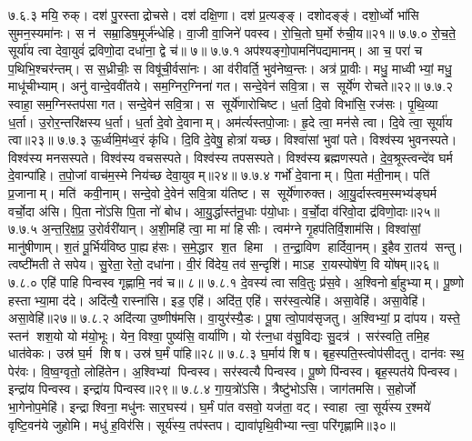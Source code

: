 ७.६.३
मयि॒ रुक्। दश॑ पु॒रस्ताद्रोचसे। दश॑ दक्षि॒णा। दश॑ प्र॒त्यङ्ङ्। दशोदङ्ङ्॑। दशो॒र्ध्वो भा॑सि सुमन॒स्यमा॑नः। स न॑ सम्रा॒डिष॒मूर्ज॑न्धेहि। वा॒जी वा॒जिने॑ पवस्व। रो॒चि॒तो घ॒र्मो रु॑ची॒य॥२१॥
७.७.०
रो॒च॒ते॒ सूर्या॑य त्वा देवा॒युवं॑ द्रविणो॒दा दधा॑ना॒ द्वे च॑॥ ७॥
\anuvakamend
७.७.१
अप॑श्यङ्गो॒पामनि॑पद्यमानम्। आ च॒ परा॑ च प॒थिभि॒श्चर॑न्तम्। स स॒ध्रीचीः॒ स विषू॑ची॒र्वसा॑नः। आ व॑रीवर्ति॒ भुव॑नेष्व॒न्तः। अत्र॑ प्रा॒वीः। मधु॒ माध्वीभ्यां॒ मधु॒ माधू॑चीभ्याम्। अनु॑ वान्दे॒ववी॑तये। सम॒ग्निर॒ग्निना॑ गत। सन्दे॒वेन॑ सवि॒त्रा। स सूर्ये॑ण रोचते॥२२॥
७.७.२
स्वाहा॒ सम॒ग्निस्तप॑सा गत। सन्दे॒वेन॑ सवि॒त्रा। स सूर्ये॑णारोचिष्ट। ध॒र्ता दि॒वो विभा॑सि॒ रज॑सः। पृ॒थि॒व्या ध॒र्ता। उ॒रोर॒न्तरि॑क्षस्य ध॒र्ता। ध॒र्ता दे॒वो दे॒वानाम्। अम॑र्त्यस्तपो॒जाः। हृ॒दे त्वा॒ मन॑से त्वा। दि॒वे त्वा॒ सूर्या॑य त्वा॥२३॥
७.७.३
ऊ॒र्ध्वमि॒म॑ध्व॒रं कृ॑धि। दि॒वि दे॒वेषु॒ होत्रा॑ यच्छ। विश्वा॑सां भुवां पते। विश्व॑स्य भुवनस्पते। विश्व॑स्य मनसस्पते। विश्व॑स्य वचसस्पते। विश्व॑स्य तपसस्पते। विश्व॑स्य ब्रह्मणस्पते। दे॒व॒श्रूस्त्वन्दे॑व घर्म दे॒वान्पा॑हि। त॒पो॒जां वाच॑म॒स्मे निय॑च्छ देवा॒युवम्॥२४॥
७.७.४
गर्भो॑ दे॒वानाम्। पि॒ता म॑ती॒नाम्। पति॑ प्र॒जानाम्। मति॑ कवी॒नाम्। सन्दे॒वो दे॒वेन॑ सवि॒त्रा य॑तिष्ट। स सूर्ये॑णारुक्त। आ॒यु॒र्दास्त्वम॒स्मभ्य॑ङ्घर्म वर्चो॒दा अ॑सि। पि॒ता नो॑ऽसि पि॒ता नो॑ बोध। आ॒यु॒र्द्धास्त॑नू॒धाः प॑यो॒धाः। व॒र्चो॒दा व॑रिवो॒दा द्र॑विणो॒दाः॥२५॥
७.७.५
अ॒न्त॒रि॒क्ष॒प्र॒ उ॒रोर्वरी॑यान्। अ॒शी॒महि॑ त्वा॒ मा मा॑ हिसीः। त्वम॑ग्ने गृ॒हप॑तिर्वि॒शाम॑सि। विश्वा॑सां॒ मानु॑षीणाम्। श॒तं पू॒र्भिर्य॑विष्ठ पा॒ह्यह॑सः। स॒मे॒द्धार श॒त हिमा। त॒न्द्रा॒विण हार्दिवा॒नम्। इ॒हैव रा॒तय॑ सन्तु। त्वष्टी॑मती ते सपेय। सु॒रेता॒ रेतो॒ दधा॑ना। वी॒रं  वि॑देय॒ तव॑ स॒न्दृशि॑। माऽह रा॒यस्पोषे॑ण॒ वि यो॑षम्॥२६॥
७.८.०
एहि॑ पाहि पिन्वस्व गृह्णामि॒ नव॑ च॥ ८॥
\anuvakamend
७.८.१
दे॒वस्य॑ त्वा सवि॒तुः प्र॑स॒वे। अ॒श्विनोर्बा॒हुभ्याम्। पू॒ष्णो हस्ताभ्या॒मा द॑दे। अदि॑त्यै॒ रास्ना॑सि। इड॒ एहि॑। अदि॑त॒ एहि॑। सर॑स्व॒त्येहि॑। असा॒वेहि॑। असा॒वेहि॑। असा॒वेहि॑॥२७॥
७.८.२
अदि॑त्या उ॒ष्णीष॑मसि। वा॒युर॑स्यै॒डः। पू॒षा त्वो॒पाव॑सृजतु। अ॒श्विभ्यां॒ प्र दा॑पय। यस्ते॒ स्तन॑ शश॒यो यो म॑यो॒भूः। येन॒ विश्वा॒ पुष्य॑सि॒ वार्या॑णि। यो र॑त्न॒धा व॑सु॒विद्यः सु॒दत्र॑। सर॑स्वति॒ तमि॒ह धात॑वेकः। उस्र॑ घ॒र्म शिष। उस्र॑ घ॒र्मं पा॑हि॥२८॥
७.८.३
घ॒र्माय॑ शिष। बृह॒स्पति॒स्त्वोप॑सीदतु। दान॑वः स्थ॒ पेर॑वः। वि॒ष्व॒ग्वृतो॒ लोहि॑तेन। अ॒श्विभ्यां पिन्वस्व। सर॑स्वत्यै पिन्वस्व। पू॒ष्णे पि॑न्वस्व। बृह॒स्पत॑ये पिन्वस्व। इन्द्रा॑य पिन्वस्व। इन्द्रा॑य पिन्वस्व॥२९॥
७.८.४
गा॒य॒त्रो॑ऽसि। त्रैष्टु॑भोऽसि। जाग॑तमसि। स॒होर्जो भा॒गेनोप॒मेहि॑। इन्द्राश्विना॒ मधु॑नः सार॒घस्य॑। घ॒र्मं पा॑त वसवो॒ यज॑ता॒ वट्। स्वाहा त्वा॒ सूर्य॑स्य र॒श्मये॑ वृष्टि॒वन॑ये जुहोमि। मधु॑ ह॒विर॑सि। सूर्य॑स्य॒ तप॑स्तप। द्यावा॑पृथि॒वीभ्यान्त्वा॒ परि॑गृह्णामि॥३०॥
